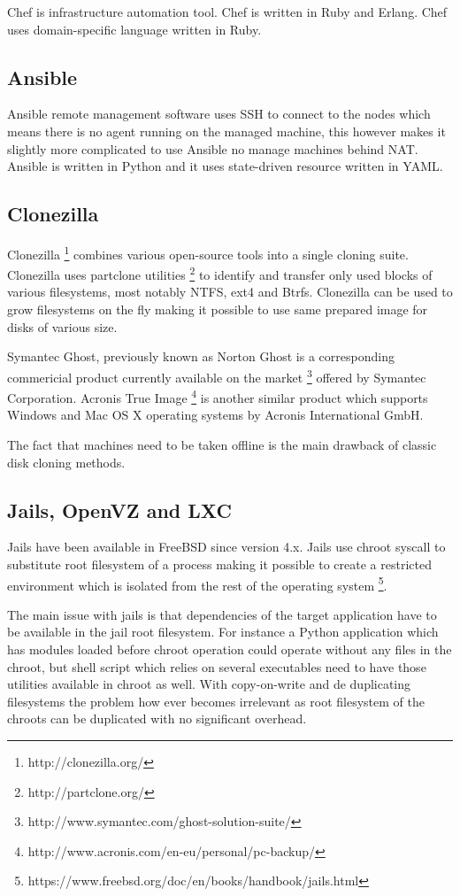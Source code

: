\documentclass{article}
\begin{document}
Chef is infrastructure automation tool. Chef is written in Ruby and Erlang. Chef uses domain-specific language written in Ruby.

\subsection{Ansible}

Ansible remote management software uses SSH to connect to the nodes which
means there is no agent running on the managed machine, this however makes
it slightly more complicated to use Ansible no manage machines behind NAT.
Ansible is written in Python and it uses state-driven resource 
written in YAML.

\subsection{Clonezilla}

Clonezilla \footnote{http://clonezilla.org/}
combines various open-source tools into a single cloning suite.
Clonezilla uses partclone utilities \footnote{http://partclone.org/} to
identify and transfer only used blocks of various filesystems, most notably
NTFS, ext4 and Btrfs. Clonezilla can be used to grow filesystems on the fly
making it possible to use same prepared image for disks of various size.

Symantec Ghost, previously known as Norton Ghost is a corresponding commericial
product currently available on the market
\footnote{http://www.symantec.com/ghost-solution-suite/}
offered by Symantec Corporation.
Acronis True Image
\footnote{http://www.acronis.com/en-eu/personal/pc-backup/}
is another similar product which supports Windows
and Mac OS X operating systems by Acronis International GmbH.

The fact that machines need to be taken offline is the main
drawback of classic disk cloning methods. 

\subsection{Jails, OpenVZ and LXC}

Jails have been available in FreeBSD since version 4.x. Jails use chroot
syscall to substitute root filesystem of a process making it possible to
create a restricted environment which is isolated from the rest of the
operating system
\footnote{https://www.freebsd.org/doc/en/books/handbook/jails.html}.

The main issue with jails is that dependencies of the target application have
to be available in the jail root filesystem. For instance a Python application
which has modules loaded before chroot operation could operate without any
files in the chroot, but shell script which relies on several executables need
to have those utilities available in chroot as well. With copy-on-write and de
duplicating filesystems the problem how ever becomes irrelevant as root
filesystem of the chroots can be duplicated with no significant overhead.
\end{document}
